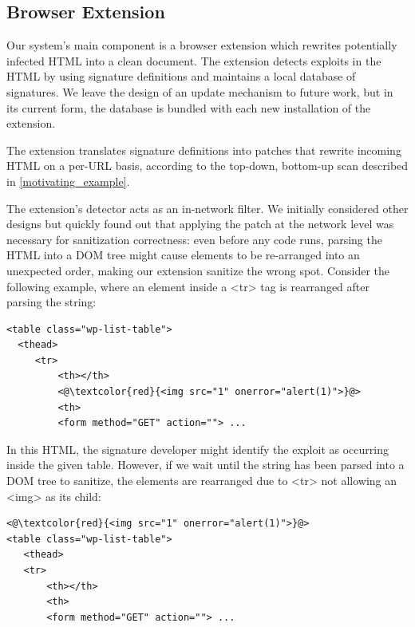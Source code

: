  \subsection{Browser Extension} \label{firefox_extension}

 Our system's main component is a browser extension which rewrites
 potentially infected HTML into a clean document.
 The extension detects exploits in the HTML by using signature definitions and
 maintains a local database of signatures. We leave the design of an
 update mechanism to future work, but in its current form, the
 database is bundled with each new installation of the extension.

 The extension translates signature definitions into patches that
 rewrite incoming HTML on a per-URL basis, according to the top-down,
 bottom-up scan described in \autoref{motivating_example}.
 
 The extension's detector acts as an in-network filter. We initially considered other designs but quickly found out that applying the patch at the network level was necessary for sanitization correctness: even before any code runs, parsing the HTML into a DOM tree
might cause elements to be re-arranged into an unexpected order,
making our extension sanitize the wrong spot.  Consider the following
example, where an element inside a <tr> tag is rearranged after
parsing the string:
\vspace{-0.2cm}
\begin{lstlisting}
<table class="wp-list-table">
  <thead>
     <tr>
	     <th></th>
	     <@\textcolor{red}{<img src="1" onerror="alert(1)">}@>
	     <th>
   	     <form method="GET" action=""> ...
\end{lstlisting}

In this HTML, the signature developer might identify the exploit as
occurring inside the given table. However, if we wait until the string
has been parsed into a DOM tree to sanitize, the elements are
rearranged due to <tr> not allowing an <img> as its child:
\vspace{-0.2cm}
\begin{lstlisting}
<@\textcolor{red}{<img src="1" onerror="alert(1)">}@>
<table class="wp-list-table">
   <thead>
   <tr>
	   <th></th>
	   <th>
       <form method="GET" action=""> ...
\end{lstlisting}

